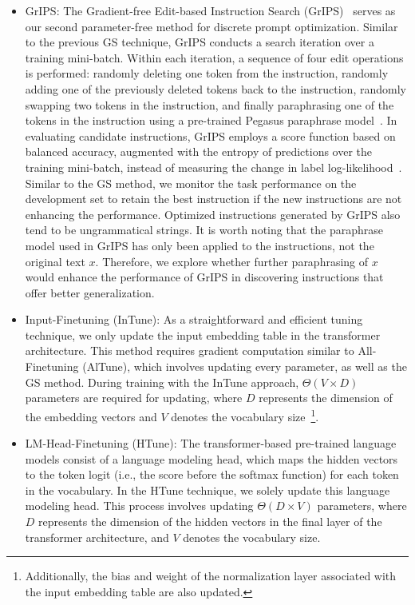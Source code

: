 \documentclass[11pt]{article}
\begin{document}
\begin{itemize}
    
    \item GrIPS: The Gradient-free Edit-based Instruction Search (GrIPS)~\cite{prasad-etal-2023-grips} serves as our second parameter-free method for discrete prompt optimization. Similar to the previous GS technique, GrIPS conducts a search iteration over a training mini-batch. Within each iteration, a sequence of four edit operations is performed: randomly deleting one token from the instruction, randomly adding one of the previously deleted tokens back to the instruction, randomly swapping two tokens in the instruction, and finally paraphrasing one of the tokens in the instruction using a pre-trained Pegasus paraphrase model~\cite{pmlr-v119-zhang20ae}. In evaluating candidate instructions, GrIPS employs a score function based on balanced accuracy, augmented with the entropy of predictions over the training mini-batch, instead of measuring the change in label log-likelihood~\cite{prasad-etal-2023-grips}. Similar to the GS method, we monitor the task performance on the development set to retain the best instruction if the new instructions are not enhancing the performance. Optimized instructions generated by GrIPS also tend to be ungrammatical strings. It is worth noting that the paraphrase model used in GrIPS has only been applied to the instructions, not the original text $x$. Therefore, we explore whether further paraphrasing of $x$ would enhance the performance of GrIPS in discovering instructions that offer better generalization.

    \item Input-Finetuning (InTune): As a straightforward and efficient tuning technique, we only update the input embedding table in the transformer architecture. This method requires gradient computation similar to All-Finetuning (AlTune), which involves updating every parameter, as well as the GS method. During training with the InTune approach, $\Theta(V \times D)$ parameters are required for updating, where $D$ represents the dimension of the embedding vectors and $V$ denotes the vocabulary size~\footnote{Additionally, the bias and weight of the normalization layer associated with the input embedding table are also updated.}.
    
    \item  LM-Head-Finetuning (HTune): The transformer-based pre-trained language models consist of a language modeling head, which maps the hidden vectors to the token logit (i.e., the score before the softmax function) for each token in the vocabulary. In the HTune technique, we solely update this language modeling head. This process involves updating $\Theta(D \times V)$ parameters, where $D$ represents the dimension of the hidden vectors in the final layer of the transformer architecture, and $V$ denotes the vocabulary size.


\end{itemize}
\end{document}
